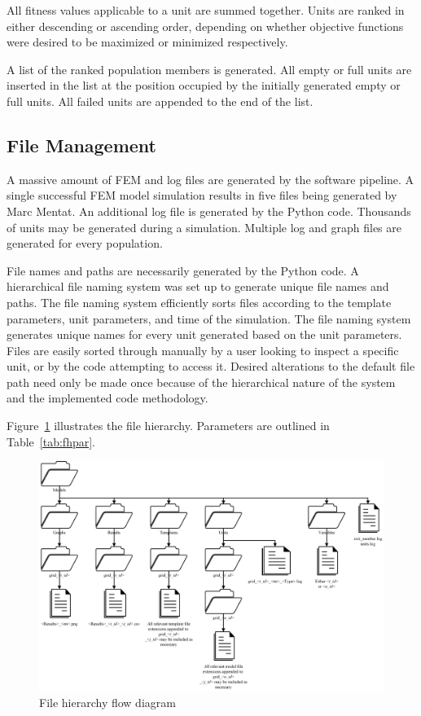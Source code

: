 All fitness values applicable to a unit are summed together. Units are ranked in either descending or ascending order, depending on whether objective functions were desired to be maximized or minimized respectively.

A list of the ranked population members is generated. All empty or full units are inserted in the list at the position occupied by the initially generated empty or full units. All failed units are appended to the end of the list.

\subsection{File Management}
\label{ssec:fm}

A massive amount of FEM and log files are generated by the software pipeline. A single successful FEM model simulation results in five files being generated by Marc Mentat. An additional log file is generated by the Python code. Thousands of units may be generated during a simulation. Multiple log and graph files are generated for every population.

File names and paths are necessarily generated by the Python code. A hierarchical file naming system was set up to generate unique file names and paths. The file naming system efficiently sorts files according to the template parameters, unit parameters, and time of the simulation. The file naming system generates unique names for every unit generated based on the unit parameters. Files are easily sorted through manually by a user looking to inspect a specific unit, or by the code attempting to access it. Desired alterations to the default file path need only be made once because of the hierarchical nature of the system and the implemented code methodology.

Figure~\ref{fig:fh} illustrates the file hierarchy. Parameters are outlined in Table~\ref{tab:fhpar}.

\begin{landscape}
 \begin{figure}[ht]
  \centering
  \includegraphics[width=1.4\textwidth]{FileHierarchy.png}
  \caption{File hierarchy flow diagram}
  \label{fig:fh}
 \end{figure}
\end{landscape}

